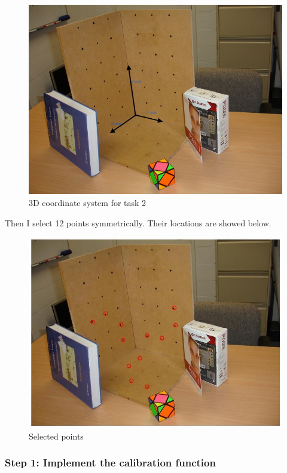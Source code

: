 \documentclass{article}
\begin{document}
\begin{figure}[htbp]
    \centering
    \includegraphics[scale = 0.35]{fig20.jpg}
    \caption{3D coordinate system for task 2}
    \label{fig17}
\end{figure}

Then I select 12 points symmetrically. Their locations are showed below.

\begin{figure}[htbp]
    \centering
    \includegraphics[scale = 0.35]{fig21.jpg}
    \caption{Selected points}
    \label{fig18}
\end{figure}

\subsubsection*{Step 1: Implement the calibration function}
\end{document}

